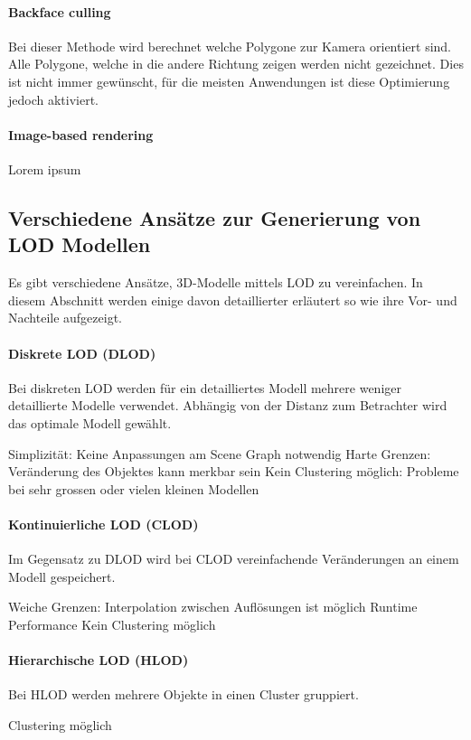 \paragraph{Backface culling}
Bei dieser Methode wird berechnet welche Polygone zur Kamera orientiert sind.
Alle Polygone, welche in die andere Richtung zeigen werden nicht gezeichnet.
Dies ist nicht immer gewünscht, für die meisten Anwendungen ist diese Optimierung jedoch aktiviert.

\paragraph{Image-based rendering}
Lorem ipsum


\subsection{Verschiedene Ansätze zur Generierung von LOD Modellen}
Es gibt verschiedene Ansätze, 3D-Modelle mittels LOD zu vereinfachen. In diesem Abschnitt werden einige davon detaillierter erläutert so wie ihre Vor- und Nachteile aufgezeigt.

\paragraph{Diskrete LOD (DLOD)}
Bei diskreten LOD werden für ein detailliertes Modell mehrere weniger detaillierte Modelle verwendet.
Abhängig von der Distanz zum Betrachter wird das optimale Modell gewählt.
\begin{itemize}
  \pro Simplizität: Keine Anpassungen am Scene Graph notwendig
  \con Harte Grenzen: Veränderung des Objektes kann merkbar sein
  \con Kein Clustering möglich: Probleme bei sehr grossen oder vielen kleinen Modellen
\end{itemize}

\paragraph{Kontinuierliche LOD (CLOD)}
Im Gegensatz zu DLOD wird bei CLOD vereinfachende Veränderungen an einem Modell gespeichert.
\begin{itemize}
  \pro Weiche Grenzen: Interpolation zwischen Auflösungen ist möglich
  \con Runtime Performance
  \con Kein Clustering möglich
\end{itemize}

\paragraph{Hierarchische LOD (HLOD)}
Bei HLOD werden mehrere Objekte in einen Cluster gruppiert.
\begin{itemize}
  \pro Clustering möglich
\end{itemize}
